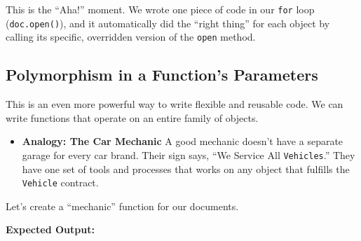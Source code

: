 \documentclass[
  letterpaper,
  DIV=11,
  numbers=noendperiod]{scrreprt}
\newenvironment{Shaded}{\begin{snugshade}}{\end{snugshade}}
\newcommand{\BuiltInTok}[1]{\textcolor[rgb]{0.00,0.23,0.31}{#1}}
\newcommand{\CharTok}[1]{\textcolor[rgb]{0.13,0.47,0.30}{#1}}
\newcommand{\CommentTok}[1]{\textcolor[rgb]{0.37,0.37,0.37}{#1}}
\newcommand{\ExtensionTok}[1]{\textcolor[rgb]{0.00,0.23,0.31}{#1}}
\newcommand{\FunctionTok}[1]{\textcolor[rgb]{0.28,0.35,0.67}{#1}}
\newcommand{\KeywordTok}[1]{\textcolor[rgb]{0.00,0.23,0.31}{\textbf{#1}}}
\newcommand{\NormalTok}[1]{\textcolor[rgb]{0.00,0.23,0.31}{#1}}
\newcommand{\OperatorTok}[1]{\textcolor[rgb]{0.37,0.37,0.37}{#1}}
\newcommand{\SpecialStringTok}[1]{\textcolor[rgb]{0.13,0.47,0.30}{#1}}
\newcommand{\StringTok}[1]{\textcolor[rgb]{0.13,0.47,0.30}{#1}}
\providecommand{\tightlist}{%
  \setlength{\itemsep}{0pt}\setlength{\parskip}{0pt}}
\begin{document}
This is the ``Aha!'' moment. We wrote one piece of code in our
\texttt{for} loop (\texttt{doc.open()}), and it automatically did the
``right thing'' for each object by calling its specific, overridden
version of the \texttt{open} method.

\subsection{Polymorphism in a Function's
Parameters}\label{polymorphism-in-a-functions-parameters}

This is an even more powerful way to write flexible and reusable code.
We can write functions that operate on an entire family of objects.

\begin{itemize}
\tightlist
\item
  \textbf{Analogy: The Car Mechanic} A good mechanic doesn't have a
  separate garage for every car brand. Their sign says, ``We Service All
  \texttt{Vehicles}.'' They have one set of tools and processes that
  works on any object that fulfills the \texttt{Vehicle} contract.
\end{itemize}

Let's create a ``mechanic'' function for our documents.

\begin{Shaded}
\end{Shaded}

\textbf{Expected Output:}
\end{document}
